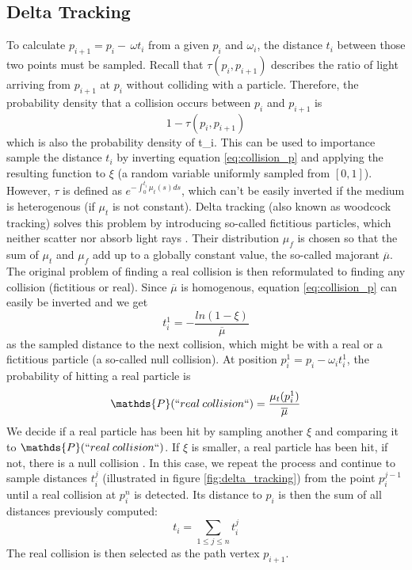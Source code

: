 \subsection{Delta Tracking}
To calculate $p_{i+1} = p_i - \,\omega t_i$ from a given $p_i$ and $\omega_i$, the distance $t_i$ between those two points must be sampled. Recall that $\tau(p_i, p_{i+1})$ describes the ratio of light arriving from $p_{i+1}$ at $p_i$ without colliding with a particle. Therefore, the probability density \cite{wiki:Probability_density_function} that a collision occurs between $p_i$ and $p_{i+1}$ is 
\begin{equation} \label{eq:collision_p}
1 - \tau({p_i, p_{i+1}})
\end{equation}
which is also the probability density of t_i.
This can be used to importance sample \cite{osti_4167844} the distance $t_i$ by inverting equation \ref{eq:collision_p} and applying the resulting function to $\xi$  (a random variable uniformly sampled from $[0,1]$). However, $\tau$ is defined as $e^{-\int_{0}^{t_i}\mu_t(s)ds}$, which can't be easily inverted if the medium is heterogenous (if $\mu_t$ is not constant).
Delta tracking (also known as woodcock tracking) solves this problem by introducing so-called fictitious particles, which neither scatter nor absorb light rays \cite{10.1145/2661229.2661292}. Their distribution $\mu_f$ is chosen so that the sum of $\mu_t$ and $\mu_f$ add up to a globally constant value, the so-called majorant $\overline{\mu}$.
The original problem of finding a real collision is then reformulated to finding any collision (fictitious or real).
Since $\overline{\mu}$ is homogenous, equation \ref{eq:collision_p} can easily be inverted \cite{morgan-delta-tracking} and we get
\begin{equation}
t_i^1 = - \frac{ln(1 - \xi)}{\overline{\mu}}
\end{equation} 
as the sampled distance to the next collision, which might be with a real or a fictitious particle (a so-called null collision).
At position $p_i^1 = p_i - \omega_i t_i^1$, the probability of hitting a real particle is 
\begin{equation}
\mathds{P}(``real \:collision``) = \frac{\mu_t(p_i^1)}{\overline{\mu}}
\end{equation}
We decide if a real particle has been hit by sampling another $\xi$ and comparing it to $\mathds{P}(``real \:collision``)$. If $\xi$ is smaller, a real particle has been hit, if not, there is a null collision \cite{10.1145/2661229.2661292}.
In this case, we repeat the process and continue to sample distances $t_i^j$ (illustrated in figure \ref{fig:delta_tracking}) from the point $p_i ^{j-1}$ until a real collision at $p_i^n$ is detected. Its distance to $p_i$ is then the sum of all distances previously computed:
\begin{equation}
t_i = \sum_{1 \le j \le n} t_i^j
\end{equation}
The real collision is then selected as the path vertex $p_{i+1}$.


